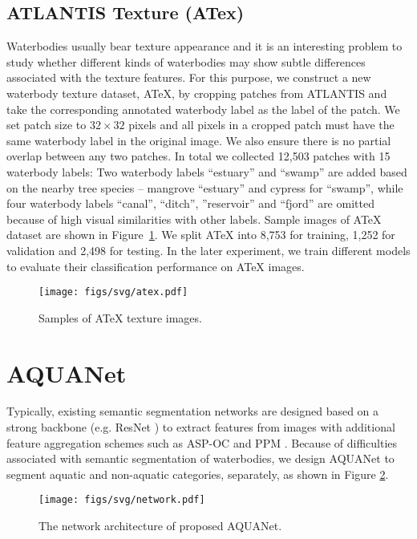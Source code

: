 \documentclass{article}
\begin{document}
\subsection{ATLANTIS Texture (ATex)}
Waterbodies usually bear texture appearance and it is an interesting problem to study whether different kinds of waterbodies may show subtle differences associated with the texture features. For this purpose, we construct a new waterbody texture dataset, ATeX, by cropping patches from ATLANTIS and take the corresponding annotated waterbody label as the label of the patch. We set patch size to $32 \times 32$ pixels and all pixels in a cropped patch must have the same waterbody label in the original image. We also ensure there is no partial overlap between any two patches. In total we collected 12,503 patches with 15 waterbody labels: Two waterbody labels ``estuary'' and ``swamp'' are added based on the nearby tree species -- mangrove ``estuary'' and cypress for ``swamp'', while four waterbody labels ``canal'', ``ditch'', ''reservoir'' and ``fjord'' are omitted because of high visual similarities with other labels. Sample images of ATeX dataset are shown in Figure~\ref{fig:atex}. We split ATeX into 8,753 for training, 1,252 for validation and 2,498 for testing. In the later experiment, we train different models to evaluate their classification performance on ATeX images.

\begin{figure}[ht]
    \centering
    \texttt{[image: figs/svg/atex.pdf]}
    \caption{Samples of ATeX texture images.}
    \label{fig:atex}
\end{figure}

\section{AQUANet}
Typically, existing semantic segmentation networks are designed based on a strong backbone (e.g. ResNet \cite{he2016deep}) to extract features from images with additional feature aggregation schemes such as ASP-OC \cite{YuanW18} and PPM \cite{zhao2017pyramid}.
Because of difficulties associated with semantic segmentation of waterbodies, we design AQUANet to segment aquatic and non-aquatic categories, separately, as shown in Figure \ref{fig:nework}. 

\begin{figure}[ht]
	\centering
	\texttt{[image: figs/svg/network.pdf]}
	\caption{The network architecture of proposed AQUANet.}
	\label{fig:nework}
\end{figure}
\end{document}
